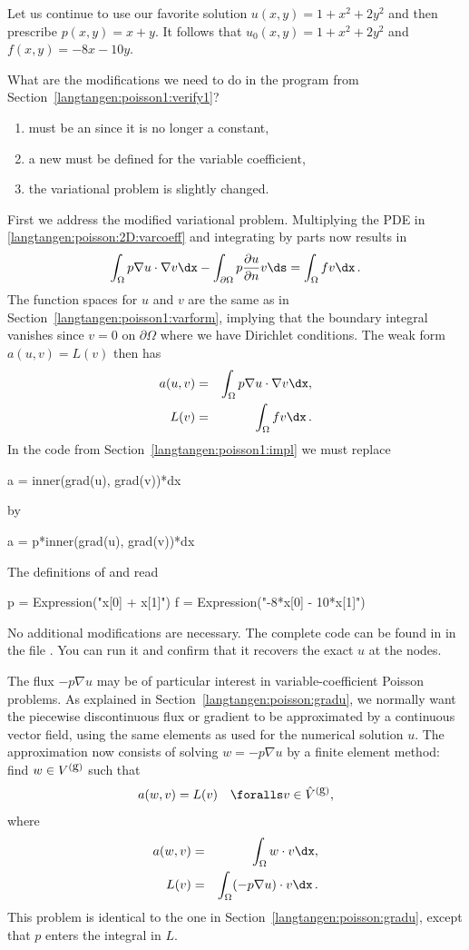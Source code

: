 Let us continue to use our favorite solution $u(x,y)=1+x^2+2y^2$ and
then prescribe $p(x,y)=x+y$. It follows that $u_0(x,y) = 1 + x^2 +
2y^2$ and $f(x,y)=-8x-10y$.

What are the modifications we need to do in the
 program from
Section~\ref{langtangen:poisson1:verify1}?
\begin{enumerate}
\item {} must be an  since it is no longer a constant,
\item a new   must be defined for the variable coefficient,
\item the variational problem is slightly changed.
\end{enumerate}
First we address the modified variational problem. Multiplying the PDE
in \eqref{langtangen:poisson:2D:varcoeff} and integrating by parts now
results in
%
\[ \int_\Omega p\nabla u\cdot\nabla v\dx -
\int_{\partial\Omega} p \frac{\partial u}{\partial n}v\ds = \int_\Omega
fv\dx\langtangenep\]
%
The function spaces for $u$ and $v$ are the same
as in Section~\ref{langtangen:poisson1:varform}, implying that the
boundary integral vanishes since $v=0$ on $\partial\Omega$ where we
have Dirichlet conditions.  The weak form $a(u,v)=L(v)$ then has
\begin{align}
a(u,v) &=& \int_\Omega p\nabla u\cdot\nabla v\dx,\\
L(v) &=& \int_\Omega fv\dx\langtangenep
\end{align}
In the code from Section~\ref{langtangen:poisson1:impl} we must replace
\begin{python}
a = inner(grad(u), grad(v))*dx
\end{python}
by
\begin{python}
a = p*inner(grad(u), grad(v))*dx
\end{python}
The definitions of  and  read
\begin{python}
p = Expression("x[0] + x[1]")
f = Expression("-8*x[0] - 10*x[1]")
\end{python}
No additional modifications are necessary. The complete code can be
found in in the file . You can run it and confirm
that it recovers the exact $u$ at the nodes.

The flux $-p\nabla u$ may be of particular interest in
variable-coefficient Poisson problems. As explained in
Section~\ref{langtangen:poisson:gradu}, we normally want the piecewise
discontinuous flux or gradient to be approximated by a continuous
vector field, using the same elements as used for the numerical
solution $u$. The approximation now consists of solving $w = -p\nabla
u$ by a finite element method: find $w\in V^{(\mbox{g})}$ such that
\begin{equation}
a(w, v) = L(v)\quad\foralls v\in \Vghat,
\end{equation}
where
\begin{eqnarray}
a(w, v) &=& \int_\Omega w\cdot v\dx,\\
L(v) &=& \int_\Omega (-p \nabla u)\cdot v\dx\langtangenep
\end{eqnarray}
This problem is identical to the one in Section~\ref{langtangen:poisson:gradu},
except that $p$ enters the integral in $L$.

